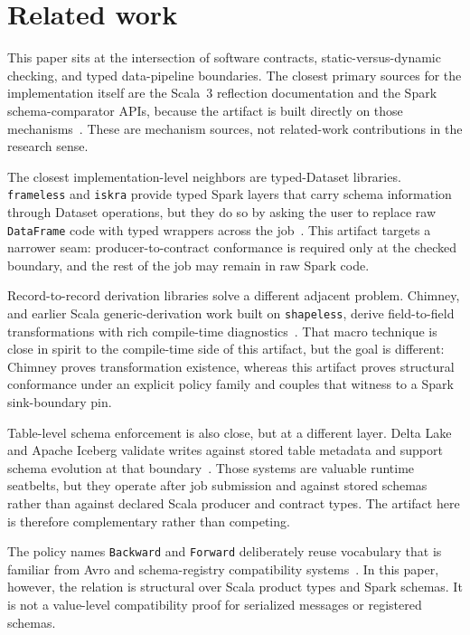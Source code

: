 \section{Related work}

This paper sits at the intersection of software contracts, static-versus-dynamic checking, and typed data-pipeline boundaries. The closest primary sources for the implementation itself are the Scala~3 reflection documentation and the Spark schema-comparator APIs, because the artifact is built directly on those mechanisms~\cite{scala3_reflection,spark_datatype}. These are mechanism sources, not related-work contributions in the research sense.

The closest implementation-level neighbors are typed-Dataset libraries. \texttt{frameless} and \texttt{iskra} provide typed Spark layers that carry schema information through Dataset operations, but they do so by asking the user to replace raw \texttt{DataFrame} code with typed wrappers across the job~\cite{frameless,iskra}. This artifact targets a narrower seam: producer-to-contract conformance is required only at the checked boundary, and the rest of the job may remain in raw Spark code.

Record-to-record derivation libraries solve a different adjacent problem. Chimney, and earlier Scala generic-derivation work built on \texttt{shapeless}, derive field-to-field transformations with rich compile-time diagnostics~\cite{chimney,shapeless}. That macro technique is close in spirit to the compile-time side of this artifact, but the goal is different: Chimney proves transformation existence, whereas this artifact proves structural conformance under an explicit policy family and couples that witness to a Spark sink-boundary pin.

Table-level schema enforcement is also close, but at a different layer. Delta Lake and Apache Iceberg validate writes against stored table metadata and support schema evolution at that boundary~\cite{delta_lake,apache_iceberg}. Those systems are valuable runtime seatbelts, but they operate after job submission and against stored schemas rather than against declared Scala producer and contract types. The artifact here is therefore complementary rather than competing.

The policy names \texttt{Backward} and \texttt{Forward} deliberately reuse vocabulary that is familiar from Avro and schema-registry compatibility systems~\cite{avro_spec,avro_compatibility}. In this paper, however, the relation is structural over Scala product types and Spark schemas. It is not a value-level compatibility proof for serialized messages or registered schemas.

